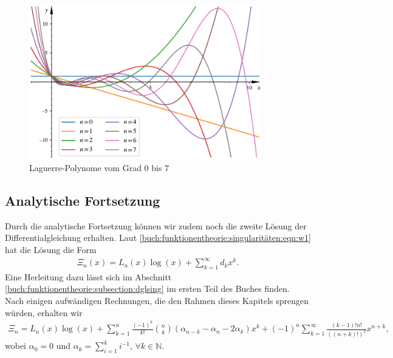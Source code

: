 \begin{figure}
\centering
\includegraphics[width=0.9\textwidth]{papers/laguerre/images/laguerre_poly.pdf}
\caption{Laguerre-Polynome vom Grad $0$ bis $7$}
\label{laguerre:fig:polyeval}
\end{figure}

\subsection{Analytische Fortsetzung}
Durch die analytische Fortsetzung können wir zudem noch die zweite Lösung der
Differentialgleichung erhalten.
Laut \eqref{buch:funktionentheorie:singularitäten:eqn:w1} hat die Lösung
die Form
\begin{align*}
\Xi_n(x)
=
L_n(x) \log(x) + \sum_{k=1}^\infty d_k x^k
.
\end{align*}
Eine Herleitung dazu lässt sich im
Abschnitt \ref{buch:funktionentheorie:subsection:dglsing}
im ersten Teil des Buches finden.
Nach einigen aufwändigen Rechnungen,
die den Rahmen dieses Kapitels sprengen würden,
erhalten wir
\begin{align*}
\Xi_n
=
L_n(x) \log(x)
+
\sum_{k=1}^n \frac{(-1)^k}{k!} \binom{n}{k}
(\alpha_{n-k} - \alpha_n - 2 \alpha_k)x^k
+
(-1)^n \sum_{k=1}^\infty \frac{(k-1)!n!}{((n+k)!)^2} x^{n+k},
\end{align*}
wobei $\alpha_0 = 0$ und $\alpha_k =\sum_{i=1}^k i^{-1}$,
$\forall k \in \mathbb{N}$.
